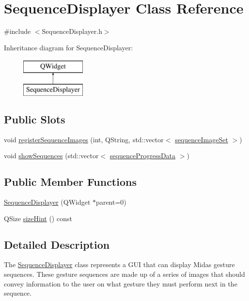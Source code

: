 \hypertarget{class_sequence_displayer}{\section{Sequence\+Displayer Class Reference}
\label{class_sequence_displayer}
}


{\ttfamily \#include $<$Sequence\+Displayer.\+h$>$}

Inheritance diagram for Sequence\+Displayer\+:\begin{figure}[H]
\begin{center}
\leavevmode
\includegraphics[height=2.000000cm]{class_sequence_displayer}
\end{center}
\end{figure}
\subsection*{Public Slots}
\begin{DoxyCompactItemize}
\item 
void \hyperlink{class_sequence_displayer_afcc86a900cb5bf28e1b3e6a09d6abeed}{register\+Sequence\+Images} (int, Q\+String, std\+::vector$<$ \hyperlink{structsequence_image_set}{sequence\+Image\+Set} $>$)
\item 
void \hyperlink{class_sequence_displayer_a78aa2211e005356237805dea967d8dda}{show\+Sequences} (std\+::vector$<$ \hyperlink{structsequence_progress_data}{sequence\+Progress\+Data} $>$)
\end{DoxyCompactItemize}
\subsection*{Public Member Functions}
\begin{DoxyCompactItemize}
\item 
\hyperlink{class_sequence_displayer_aa5f4a391a77a9b208ed0a075515ce554}{Sequence\+Displayer} (Q\+Widget $\ast$parent=0)
\item 
Q\+Size \hyperlink{class_sequence_displayer_ab8cad0c7ce49e97ed75af555b5e04556}{size\+Hint} () const 
\end{DoxyCompactItemize}


\subsection{Detailed Description}
The \hyperlink{class_sequence_displayer}{Sequence\+Displayer} class represents a G\+U\+I that can display Midas gesture sequences. These gesture sequences are made up of a series of images that should convey information to the user on what gesture they must perform next in the sequence. 

